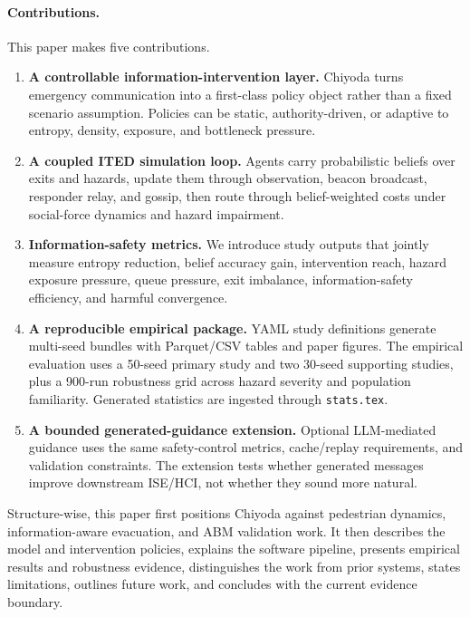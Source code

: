 \paragraph{Contributions.} This paper makes five contributions.

\begin{enumerate}
\item \textbf{A controllable information-intervention layer.} Chiyoda turns
emergency communication into a first-class policy object rather than a fixed
scenario assumption. Policies can be static, authority-driven, or adaptive to
entropy, density, exposure, and bottleneck pressure.

\item \textbf{A coupled ITED simulation loop.} Agents carry probabilistic
beliefs over exits and hazards, update them through observation, beacon
broadcast, responder relay, and gossip, then route through belief-weighted
costs under social-force dynamics and hazard impairment.

\item \textbf{Information-safety metrics.} We introduce study outputs that
jointly measure entropy reduction, belief accuracy gain, intervention reach,
hazard exposure pressure, queue pressure, exit imbalance, information-safety
efficiency, and harmful convergence.

\item \textbf{A reproducible empirical package.} YAML study definitions
generate multi-seed bundles with Parquet/CSV tables and paper figures. The
empirical evaluation uses a 50-seed primary study and two 30-seed supporting
studies, plus a 900-run robustness grid across hazard severity and population
familiarity. Generated statistics are ingested through \texttt{stats.tex}.

\item \textbf{A bounded generated-guidance extension.} Optional LLM-mediated
guidance uses the same safety-control metrics, cache/replay requirements, and
validation constraints. The extension tests whether generated messages improve
downstream ISE/HCI, not whether they sound more natural.
\end{enumerate}

Structure-wise, this paper first positions Chiyoda against pedestrian
dynamics, information-aware evacuation, and ABM validation work. It then
describes the model and intervention policies, explains the software pipeline,
presents empirical results and robustness evidence, distinguishes the work
from prior systems, states limitations, outlines future work, and concludes
with the current evidence boundary.

